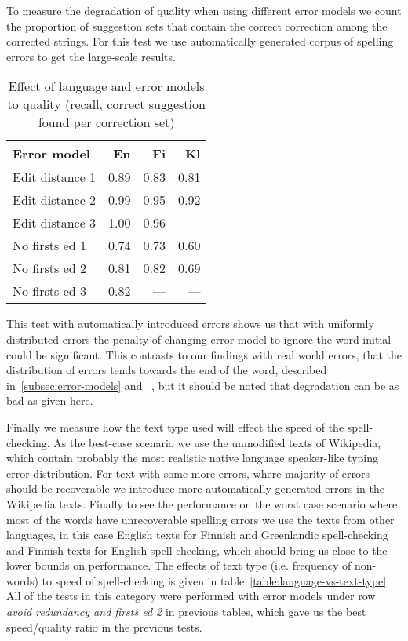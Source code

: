 \documentclass[11pt]{article}
\begin{document}
To measure the degradation of quality when using different error models we
count the proportion of suggestion sets that contain the correct correction
among the corrected strings. For this test we use automatically generated corpus
of spelling errors to get the large-scale results.

\begin{table}[h]
\begin{center}
\begin{scriptsize}
\begin{tabular}{|l|rrr|}
\hline
\bf Error model & \bf En & \bf Fi & \bf Kl\\ 
\hline
\hline
\hline
Edit distance 1 &
0.89&0.83&0.81
\\
Edit distance 2 &
0.99&0.95&0.92
\\
Edit distance 3 &
1.00&0.96&---
\\
No firsts ed 1 & 
0.74&0.73&0.60
\\
No firsts ed 2 &
0.81&0.82&0.69
\\
No firsts ed 3 &
0.82&---&---
\\
\hline
\end{tabular}
\end{scriptsize}
\end{center}
\caption{\label{table:error-model-vs-language} Effect of language and 
error models to quality (recall, correct suggestion found per
correction set)}
\end{table}

This test with automatically introduced errors shows us that with uniformly
distributed errors the penalty of changing error model to ignore the
word-initial could be significant. This contrasts to our findings with real
world errors, that the distribution of errors tends towards the end of the word,
described in~\ref{subsec:error-models} and ~\cite{Bhagat/2007},
but it should be noted that degradation can be as bad as given here.

Finally we measure how the text type used will effect the speed of the
spell-checking. As the best-case scenario we use the unmodified texts of
Wikipedia, which contain probably the most realistic native language
speaker-like typing error distribution. For text with some more errors, where
majority of errors should be recoverable we introduce more automatically
generated errors in the Wikipedia texts. Finally to see the performance on
the worst case scenario where most of the words have unrecoverable
spelling errors
we use the texts from other languages, in this case English texts for Finnish
and Greenlandic spell-checking and Finnish texts for English spell-checking,
which should bring us close to the lower bounds on performance. The
effects of text type (i.e. frequency of non-words) to speed of spell-checking
is given in table~\ref{table:language-vs-text-type}. All of
the tests in this category were performed with error models under row
\emph{avoid redundancy and firsts ed 2} in previous tables, which gave us the
best speed/quality ratio in the previous tests.
\end{document}
